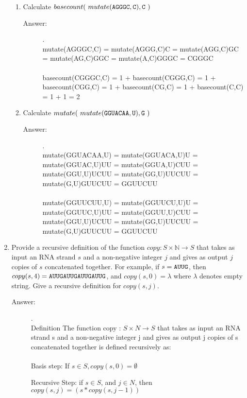\documentclass[12pt, oneside]{article}
\begin{document}
\begin{enumerate}
\begin{enumerate}
\item Calculate $basecount( ~mutate(\texttt{A}\texttt{G}\texttt{G}\texttt{G}\texttt{C}, \texttt{C}), \texttt{C}~)$
\begin{description}
    \item[Answer:] .\\
    mutate(AGGGC,C) = mutate(AGGG,C)C = mutate(AGG,C)GC = mutate(AG,C)GGC = mutate(A,C)GGGC = CGGGC\\\\
    basecount(CGGGC,C) = 1 + basecount(CGGG,C) = 1 + basecount(CGG,C) = 1 + basecount(CG,C) = 1 + basecount(C,C) = 1 + 1 = 2
\end{description}
\item Calculate $mutate( ~mutate(\texttt{G}\texttt{G}\texttt{U}\texttt{A}\texttt{C}\texttt{A}\texttt{A}, \texttt{U}), \texttt{G}~)$
\begin{description}
    \item[Answer:] .\\
    mutate(GGUACAA,U) = mutate(GGUACA,U)U = mutate(GGUAC,U)UU = mutate(GGUA,U)CUU = mutate(GGU,U)UCUU = mutate(GG,U)UUCUU = mutate(G,U)GUUCUU = GGUUCUU\\\\
    mutate(GGUUCUU,U) = mutate(GGUUCU,U)U = mutate(GGUUC,U)UU = mutate(GGUU,U)CUU = mutate(GGU,U)UCUU = mutate(GG,U)UUCUU = mutate(G,U)GUUCUU = GGUUCUU
\end{description}
\end{enumerate}


\quad


\item Provide a recursive definition of the function $\textit{copy} : S \times \mathbb{N} \to S$ that takes as input an RNA strand $s$ and a non-negative integer $j$ and gives as output $j$ copies of $s$ concatenated together. For example, if $s = \texttt{A}\texttt{U}\texttt{U}\texttt{G}$, then $copy(s,4) = \texttt{A}\texttt{U}\texttt{U}\texttt{G}\texttt{A}\texttt{U}\texttt{U}\texttt{G}\texttt{A}\texttt{U}\texttt{U}\texttt{G}\texttt{A}\texttt{U}\texttt{U}\texttt{G}$, and $copy(s,0) = \lambda$ where $\lambda$ denotes empty string. Give a recursive definition for $copy(s,j)$.
\begin{description}
    \item[Answer:] .\\
    Definition The function copy : $S \times N \rightarrow S$ that takes as input an RNA strand s and a non-negative integer j and gives as output j copies of s concatenated together is defined recursively as:\\\\

    Basis step: If $s \in S, copy(s,0) = \emptyset$

    Recursive Step: if $s \in S$, and $j \in N$, then $copy(s,j) = (s * copy(s,j-1))$
\end{description}
\quad


\end{enumerate}
\end{document}
